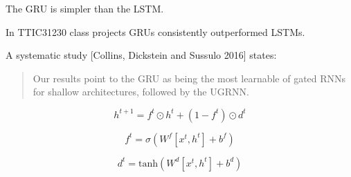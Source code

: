 {

The GRU is simpler than the LSTM.

\vfill
In TTIC31230 class projects GRUs consistently outperformed LSTMs.

\vfill
A systematic study [Collins, Dickstein and Sussulo 2016] states:

\begin{quotation}
  Our results point to the GRU as being the most learnable of gated RNNs for shallow architectures, followed by the UGRNN.
\end{quotation}



$$h^{t+1} = f^t\odot h^t + (1-f^t)\odot d^t$$

$$f^t = \sigma(W^f[x^t,h^t] + b^f)$$

$$d^t =  \mathrm{tanh}(W^{d}[x^t,h^t] + b^d)$$


}

